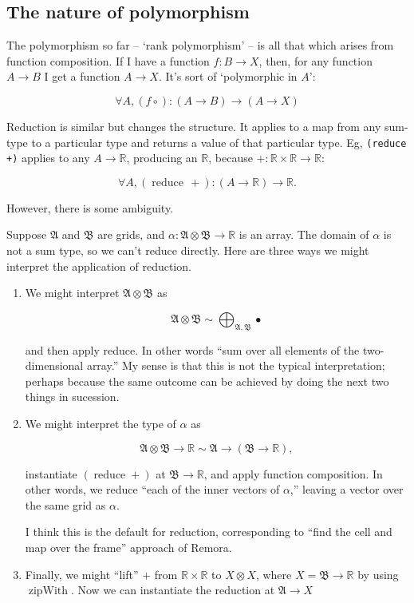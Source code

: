 \documentclass[11pt]{article}
\newcommand{\gr}[1]{\mathfrak{#1}}
\newcommand{\R}{\mathbb{R}}
\newcommand{\unit}{\bullet}
\DeclareMathOperator{\reduce}{reduce}
\DeclareMathOperator{\zipWith}{zipWith}
\begin{document}
\subsection{The nature of polymorphism}
\label{sec:orgd61f222}

The polymorphism so far -- ‘rank polymorphism’ -- is all that which arises from
function composition. If I have a function \(f:B\to X\), then, for any function
\(A\to B\) I get a function \(A\to X\). It's sort of ‘polymorphic in \(A\)’:

$$
\forall A, (f\circ) : (A\to B)\to (A\to X)
$$

Reduction is similar but changes the structure. It applies to a map from any
sum-type to a particular type and returns a value of that particular type. Eg,
\texttt{(reduce +)} applies to any \(A\to\R\), producing an \(\R\), because
\(+:\R\times\R\to\R\):

$$
\forall A, (\operatorname{reduce}\, +) : (A \to \R)\to \R.
$$

However, there is some ambiguity. 

Suppose \(\gr{A}\) and \(\gr{B}\) are grids, and \(\alpha : \gr{A}\otimes\gr{B}\to\R\)
is an array. The domain of \(\alpha\) is not a sum type, so we can't reduce
directly. Here are three ways we might interpret the application of reduction. 

\begin{enumerate}
\item We might interpret \(\gr{A}\otimes\gr{B}\) as 

$$
   \gr{A}\otimes\gr{B} \sim \bigoplus_{\gr{A}, \gr{B}} \unit  
   $$

and then apply reduce. In other words “sum over all elements of the
two-dimensional array.” My sense is that this is not the typical
interpretation; perhaps because the same outcome can be achieved by doing the
next two things in sucession.

\item We might interpret the type of \(\alpha\) as

$$
   \gr{A}\otimes\gr{B}\to\R \sim \gr{A} \to (\gr{B}\to \R),
   $$

instantiate \((\reduce +)\) at \(\gr{B}\to\R\), and apply function
composition. In other words, we reduce “each of the inner vectors of
\(\alpha\),” leaving a vector over the same grid as \(\alpha\).

I think this is the default for reduction, corresponding to “find the cell
and map over the frame” approach of Remora.

\item Finally, we might “lift” \(+\) from \(\R\times \R\) to \(X\otimes X\), where \(X =
   \gr{B}\to\R\) by using \(\zipWith\). Now we can instantiate the reduction at
\(\gr{A}\to X\)
\end{enumerate}
\end{document}
